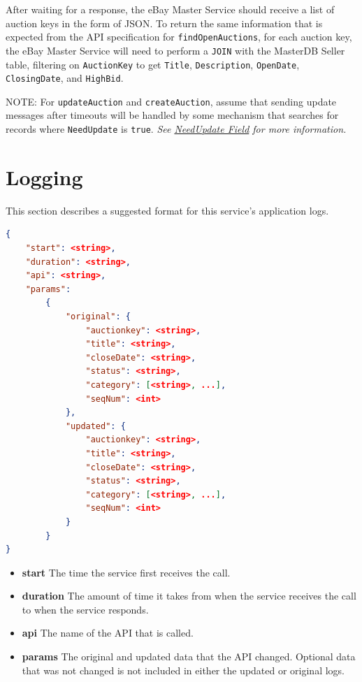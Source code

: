 \documentclass[12pt,a4paper]{article}
\begin{document}
After waiting for a response, the eBay Master Service should receive a list of auction keys 
in the form of JSON.  To return the same information that is expected from the API specification 
for \texttt{findOpenAuctions}, for each auction key, the eBay Master Service will need to perform a 
\texttt{JOIN} with the MasterDB Seller table, filtering on \texttt{AuctionKey} to get \texttt{Title}, 
\texttt{Description}, \texttt{OpenDate}, \texttt{ClosingDate}, and \texttt{HighBid}.

\vspace{\baselineskip}
\vspace{\baselineskip}
\vspace{\baselineskip}
\vspace{\baselineskip}
\vspace{\baselineskip}
\vspace{\baselineskip}

NOTE: For \texttt{updateAuction} and \texttt{createAuction}, assume that sending update messages after timeouts will be handled by some mechanism that
searches for records where \texttt{NeedUpdate} is \texttt{true}.
\emph{See \hyperref[sec:needupdate]{NeedUpdate Field} for more information.}

\pagebreak
\section{Logging}

This section describes a suggested format for this service's application logs.


\begin{lstlisting}[boxpos=t,language=json,firstnumber=1]
{
    "start": <string>,
    "duration": <string>,
    "api": <string>,
    "params":
        {
            "original": {
                "auctionkey": <string>,
                "title": <string>,
                "closeDate": <string>,
                "status": <string>, 
                "category": [<string>, ...],
                "seqNum": <int> 
            }, 
            "updated": {
                "auctionkey": <string>,
                "title": <string>,
                "closeDate": <string>,
                "status": <string>,
                "category": [<string>, ...],
                "seqNum": <int> 
            }
        }
}           
\end{lstlisting}

\begin{itemize}
    \item \textbf{start} The time the service first receives the call.
    \item \textbf{duration} The amount of time it takes from when the service
        receives the call to when the service responds.
    \item \textbf{api} The name of the API that is called.
    \item \textbf{params} The original and updated data that the API changed.
        Optional data that was not changed is not included in either the
        updated or original logs.
\end{itemize}
\end{document}
